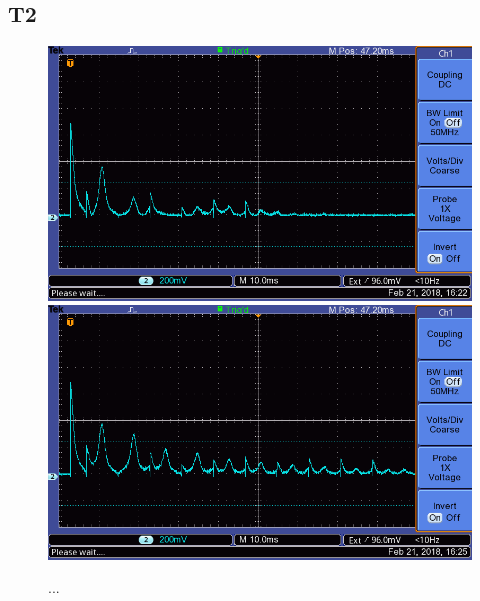 \documentclass[12pt,a4paper]{article}
\begin{document}
\subsection{T2}
\begin{figure}
\centering
\includegraphics[scale=0.8]{Bilder/T2CP.png}
\includegraphics[scale=0.8]{Bilder/T2MG.png}
\caption{...}
\label{fig:MessungT1_Beispiel}
\end{figure}
\end{document}
